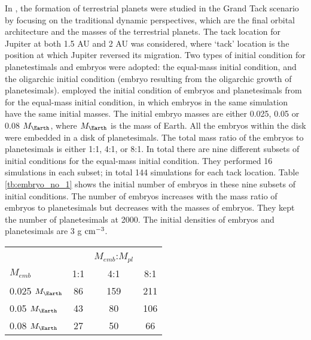 \documentclass{aa}
\begin{document}
In \cite{brasser2016analysis}, the formation of terrestrial planets were studied in the Grand Tack scenario by focusing on the traditional dynamic perspectives, which are the final orbital architecture and the masses of the terrestrial planets. The tack location for Jupiter at both 1.5 AU and 2 AU was considered, where ‘tack’ location is the position at which Jupiter reversed its migration. Two types of initial condition for planetestimals and embryos were adopted: the equal-mass initial condition, and the oligarchic initial condition (embryo resulting from the oligarchic growth of planetesimals). \cite{brasser2016analysis} employed the initial condition of embryos and planetesimals from \cite{jacobson2014lunar} for the equal-mass initial condition, in which embryos in the same simulation have the same initial masses. The initial embryo masses are either 0.025, 0.05 or 0.08 $M_{\Earth}$, where $M_{\Earth}$ is the mass of Earth. All the embryos within the disk were embedded in a disk of planetesimals. The total mass ratio of the embryos to planetesimals is either 1:1, 4:1, or 8:1. In total there are nine different subsets of initial conditions for the equal-mass initial condition. They performed 16 simulations in each subset; in total 144 simulations for each tack location. Table \ref{tb:embryo_no_1} shows the initial number of embryos in these nine subsets of initial conditions. The number of embryos increases with the mass ratio of embryos to planetesimals but decreases with the masses of embryos. They kept the number of planetesimals at 2000. The initial densities of embryos and planetesimals are 3 g $\rm cm^{-3}$.

\begin{table*}
\caption{Initial number of embryos in each subset of the simulations with equal-mass embryos. They are classified by different masses of embryos, $M_{emb}$  and different mass ratio of embryos to planetesimals, $M_{emb}$:$M_{pl}$.}
\label{tb:embryo_no_1}
\centering
\begin{tabular}{lccc}
\hline\hline
 &  & $M_{emb}$:$M_{pl}$ & \\
 $M_{emb}$ & 1:1 & 4:1 & 8:1\\
\hline
0.025 $M_{\Earth}$ & 86 & 159 & 211 \\
0.05 $M_{\Earth}$  & 43 & 80  & 106 \\
0.08 $M_{\Earth}$  & 27 & 50  & 66  \\
\hline
\end{tabular}
\end{table*} 
\end{document}
